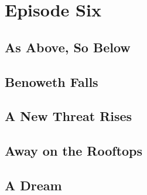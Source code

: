 \documentclass[././main.tex]{subfiles}
\begin{document}
\section{Episode Six}
\subsection{As Above, So Below}
\subsection{Benoweth Falls}
\subsection{A New Threat Rises}
\subsection{Away on the Rooftops}
\subsection{A Dream}
\end{document}
